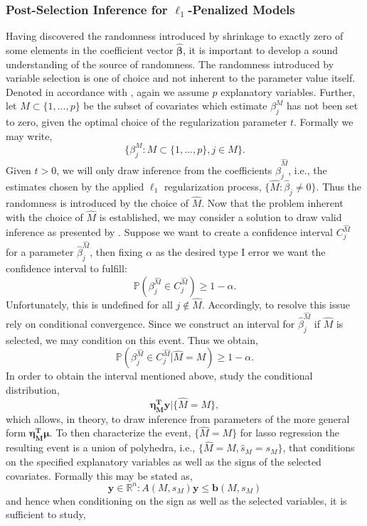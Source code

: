 \documentclass[a4paper,12pt, headsepline]{scrartcl}
\numberwithin{equation}{section}
\begin{document}
\subsubsection{Post-Selection Inference for $\ell_1$-Penalized Models}\label{subsubsec:psi}
Having discovered the randomness introduced by shrinkage to exactly zero of some elements in the coefficient vector $\bm{\hat{\beta}}$, it is important to develop a sound understanding of the source of randomness. The randomness introduced by variable selection is one of choice and not inherent to the parameter value itself. Denoted in accordance with \citet{Lee2016}, again we assume $p$ explanatory variables. Further, let $M\subset\{1, ..., p\}$ be the subset of covariates which estimate $\beta_j^M$ has not been set to zero, given the optimal choice of the regularization parameter $t$. Formally we may write,
\[
\{\beta_j^M: M\subset\{1, ..., p\}, j \in M\}.
\]
Given $t > 0$, we will only draw inference from the coefficients $\hat\beta_j^{\hat M}$, i.e., the estimates chosen by the applied $\ell_1$ regularization process, $\{\hat M: \hat\beta_j \neq 0\}$. Thus the randomness is introduced by the choice of $\hat M$. Now that the problem inherent with the choice of $\hat M$ is established, we may consider a solution to draw valid inference as presented by \citet{Lee2016}. Suppose we want to create a confidence interval $C_j^{\hat M}$ for a parameter $\hat\beta_j^{\hat M}$, then fixing $\alpha$ as the desired type I error we want the confidence interval to fulfill:
\[
\mathbb{P}(\beta_j^{\hat M} \in C_j^{\hat M}) \geq 1 - \alpha.
\]
Unfortunately, this is undefined for all $j \notin \hat M$. Accordingly, to resolve this issue \citet{Lee2016} rely on conditional convergence. Since we construct an interval for $\hat\beta_j^{\hat M}$ if $\hat M$ is selected, we may condition on this event. Thus we obtain,
\[
\mathbb{P}(\beta_j^{\hat M} \in C_j^{\hat M}| \hat M = M) \geq 1 - \alpha.
\]
In order to obtain the interval mentioned above, \citet{Lee2016} study the conditional distribution,
\[
\bm{\eta_M^Ty}|\{\hat M = M\},
\]
which allows, in theory, to draw inference from parameters of the more general form $\bm{\eta_M^T\mu}$. To then characterize the event, $\{\hat M = M\}$ for lasso regression the resulting event is a union of polyhedra, i.e., $\{\hat M = M, \hat s_M = s_M\}$, that conditions on the specified explanatory variables as well as the signs of the selected covariates. Formally this may be stated as,
\[
\bm{y} \in \mathbb{R}^n: A(M, s_M)\bm{y} \leq \bm{b}(M, s_M)
\]
and hence when conditioning on the sign as well as the selected variables, it is sufficient to study,
\end{document}
